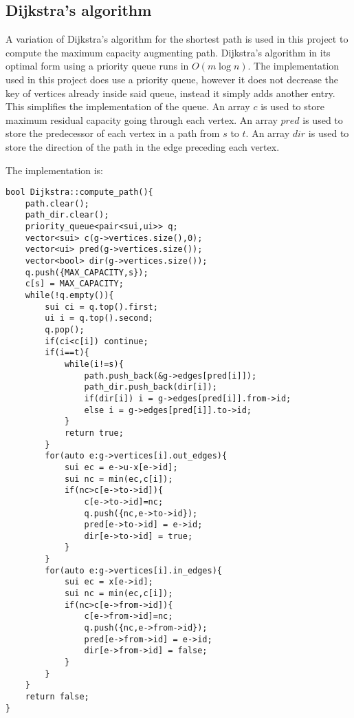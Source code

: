 \subsection{Dijkstra's algorithm}
A variation of Dijkstra's algorithm for the shortest path is used in this project to compute the maximum capacity augmenting path.
Dijkstra's algorithm in its optimal form using a priority queue runs in $O(m\log n)$. The implementation used in this project does use a priority queue,
however it does not decrease the key of vertices already inside said queue, instead it simply adds another entry. This simplifies the implementation of the queue.
An array $c$ is used to store maximum residual capacity going through each vertex.
An array $pred$ is used to store the predecessor of each vertex in a path from $s$ to $t$.
An array $dir$ is used to store the direction of the path in the edge preceding each vertex.

The implementation is:
\begin{verbatim}
bool Dijkstra::compute_path(){
	path.clear();
	path_dir.clear();
	priority_queue<pair<sui,ui>> q;
	vector<sui> c(g->vertices.size(),0);
	vector<ui> pred(g->vertices.size());
	vector<bool> dir(g->vertices.size());
	q.push({MAX_CAPACITY,s});
	c[s] = MAX_CAPACITY;
	while(!q.empty()){
		sui ci = q.top().first;
		ui i = q.top().second;
		q.pop();
		if(ci<c[i]) continue;
		if(i==t){
			while(i!=s){
				path.push_back(&g->edges[pred[i]]);
				path_dir.push_back(dir[i]);
				if(dir[i]) i = g->edges[pred[i]].from->id;
				else i = g->edges[pred[i]].to->id;
			}
			return true;
		}
		for(auto e:g->vertices[i].out_edges){
			sui ec = e->u-x[e->id];
			sui nc = min(ec,c[i]);
			if(nc>c[e->to->id]){
				c[e->to->id]=nc;
				q.push({nc,e->to->id});
				pred[e->to->id] = e->id;
				dir[e->to->id] = true;
			}
		}
		for(auto e:g->vertices[i].in_edges){
			sui ec = x[e->id];
			sui nc = min(ec,c[i]);
			if(nc>c[e->from->id]){
				c[e->from->id]=nc;
				q.push({nc,e->from->id});
				pred[e->from->id] = e->id;
				dir[e->from->id] = false;
			}
		}
	}
	return false;
}
\end{verbatim}

